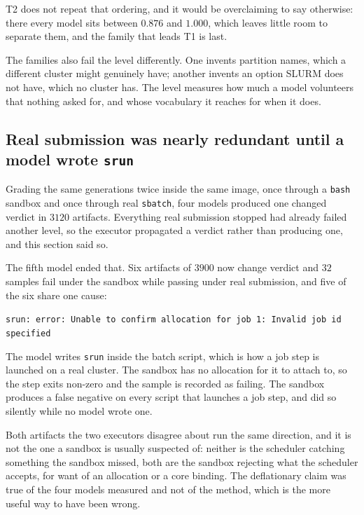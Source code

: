 \documentclass[11pt,a4paper]{article}
\begin{document}
T2 does not repeat that ordering, and it would be overclaiming to say otherwise: there every model
sits between $0.876$ and $1.000$, which leaves little room to separate them, and the family that
leads T1 is last.

The families also fail the level differently. One invents partition names, which a different cluster
might genuinely have; another invents an option SLURM does not have, which no cluster has. The
level measures how much a model volunteers that nothing asked for, and whose vocabulary it reaches
for when it does.

\subsection{Real submission was nearly redundant until a model wrote \texttt{srun}}

Grading the same generations twice inside the same image, once through a \texttt{bash} sandbox and
once through real \texttt{sbatch}, four models produced one changed verdict in $3120$ artifacts.
Everything real submission stopped had already failed another level, so the executor propagated a
verdict rather than producing one, and this section said so.

The fifth model ended that. Six artifacts of $3900$ now change verdict and $32$ samples fail under
the sandbox while passing under real submission, and five of the six share one cause:

\begin{center}
\small\texttt{srun: error: Unable to confirm allocation for job 1: Invalid job id specified}
\end{center}

The model writes \texttt{srun} inside the batch script, which is how a job step is launched on a
real cluster. The sandbox has no allocation for it to attach to, so the step exits non-zero and the
sample is recorded as failing. The sandbox produces a false negative on every script that launches
a job step, and did so silently while no model wrote one.

Both artifacts the two executors disagree about run the same direction, and it is not the one a
sandbox is usually suspected of: neither is the scheduler catching something the sandbox missed,
both are the sandbox rejecting what the scheduler accepts, for want of an allocation or a core
binding. The deflationary claim was true of the four models measured and not of the method, which
is the more useful way to have been wrong.
\end{document}
